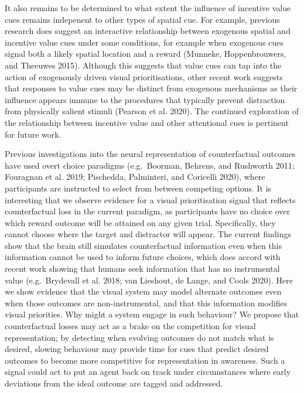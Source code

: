 \documentclass[11pt,halfline,a4paper,]{ouparticle}
\begin{document}
It also remains to be determined to what extent the influence of incentive value cues remains indepenent to other types of spatial cue. For example, previous research does suggest an interactive relationship between exogenous spatial and incentive value cues under some conditions, for example when exogenous cues signal both a likely spatial location and a reward (Munneke, Hoppenbrouwers, and Theeuwes 2015). Although this suggests that value cues can tap into the action of exogenously driven visual prioritisations, other recent work suggests that responses to value cues may be distinct from exogenous mechanisms as their influence appears immune to the procedures that typically prevent distraction from physically salient stimuli (Pearson et al. 2020). The continued exploration of the relationship between incentive value and other attentional cues is pertinent for future work.

Previous investigations into the neural representation of counterfactual outcomes have used overt choice paradigms (e.g.~Boorman, Behrens, and Rushworth 2011; Fouragnan et al. 2019; Pischedda, Palminteri, and Coricelli 2020), where participants are instructed to select from between competing options. It is interesting that we observe evidence for a visual prioritisation signal that reflects counterfactual loss in the current paradigm, as participants have no choice over which reward outcome will be attained on any given trial. Specifically, they cannot choose where the target and distractor will appear. The current findings show that the brain still simulates counterfactual information even when this information cannot be used to inform future choices, which does accord with recent work showing that humans seek information that has no instrumental value (e.g.~Brydevall et al. 2018; van Lieshout, de Lange, and Cools 2020). Here we show evidence that the visual system may model alternate outcomes even when those outcomes are non-instrumental, and that this information modifies visual priorities. Why might a system engage in such behaviour? We propose that counterfactual losses may act as a brake on the competition for visual representation; by detecting when evolving outcomes do not match what is desired, slowing behaviour may provide time for cues that predict desired outcomes to become more competitive for representation in awareness. Such a signal could act to put an agent back on track under circumstances where early deviations from the ideal outcome are tagged and addressed.
\end{document}

